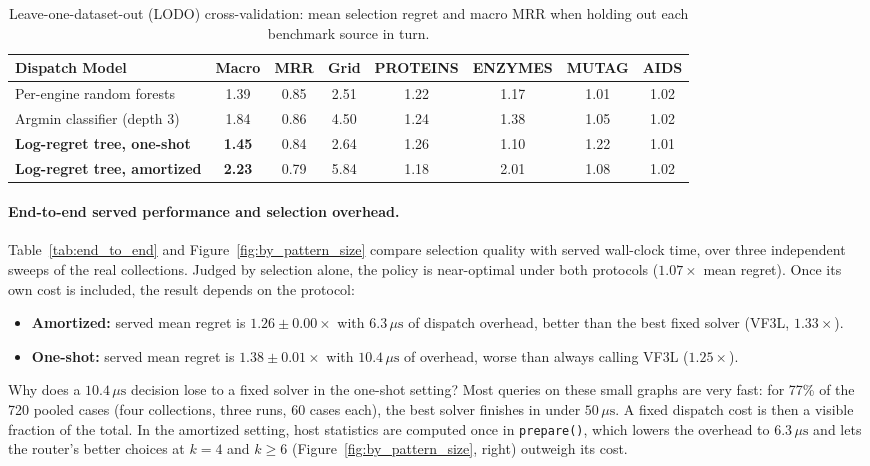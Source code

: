 \documentclass[11pt,a4paper]{article}
\begin{document}
\begin{table}[t]
\centering
\caption{Leave-one-dataset-out (LODO) cross-validation: mean selection regret and macro MRR when holding out each benchmark source in turn.}
\label{tab:lodo}
\footnotesize
\setlength{\tabcolsep}{0pt}
\begin{tabular*}{\textwidth}{@{\extracolsep{\fill}}lccccccc@{}}
\toprule
\textbf{Dispatch Model} & \textbf{Macro} & \textbf{MRR} & \textbf{Grid} & \textbf{PROTEINS} & \textbf{ENZYMES} & \textbf{MUTAG} & \textbf{AIDS} \\
\midrule
Per-engine random forests & 1.39 & 0.85 & 2.51 & 1.22 & 1.17 & 1.01 & 1.02 \\
Argmin classifier (depth 3) & 1.84 & 0.86 & 4.50 & 1.24 & 1.38 & 1.05 & 1.02 \\
\textbf{Log-regret tree, one-shot} & \textbf{1.45} & 0.84 & 2.64 & 1.26 & 1.10 & 1.22 & 1.01 \\
\textbf{Log-regret tree, amortized} & \textbf{2.23} & 0.79 & 5.84 & 1.18 & 2.01 & 1.08 & 1.02 \\
\bottomrule
\end{tabular*}
\end{table}

\paragraph{End-to-end served performance and selection overhead.} Table~\ref{tab:end_to_end} and Figure~\ref{fig:by_pattern_size} compare selection quality with served wall-clock time, over three independent sweeps of the real collections. Judged by selection alone, the policy is near-optimal under both protocols ($1.07\times$ mean regret). Once its own cost is included, the result depends on the protocol:
\begin{itemize}
    \item \textbf{Amortized:} served mean regret is $1.26 \pm 0.00\times$ with $6.3\,\mu\text{s}$ of dispatch overhead, better than the best fixed solver (VF3L, $1.33\times$).
    \item \textbf{One-shot:} served mean regret is $1.38 \pm 0.01\times$ with $10.4\,\mu\text{s}$ of overhead, worse than always calling VF3L ($1.25\times$).
\end{itemize}

Why does a $10.4\,\mu\text{s}$ decision lose to a fixed solver in the one-shot setting? Most queries on these small graphs are very fast: for 77\% of the 720 pooled cases (four collections, three runs, 60 cases each), the best solver finishes in under $50\,\mu\text{s}$. A fixed dispatch cost is then a visible fraction of the total. In the amortized setting, host statistics are computed once in \texttt{prepare()}, which lowers the overhead to $6.3\,\mu\text{s}$ and lets the router's better choices at $k=4$ and $k \ge 6$ (Figure~\ref{fig:by_pattern_size}, right) outweigh its cost.
\end{document}
